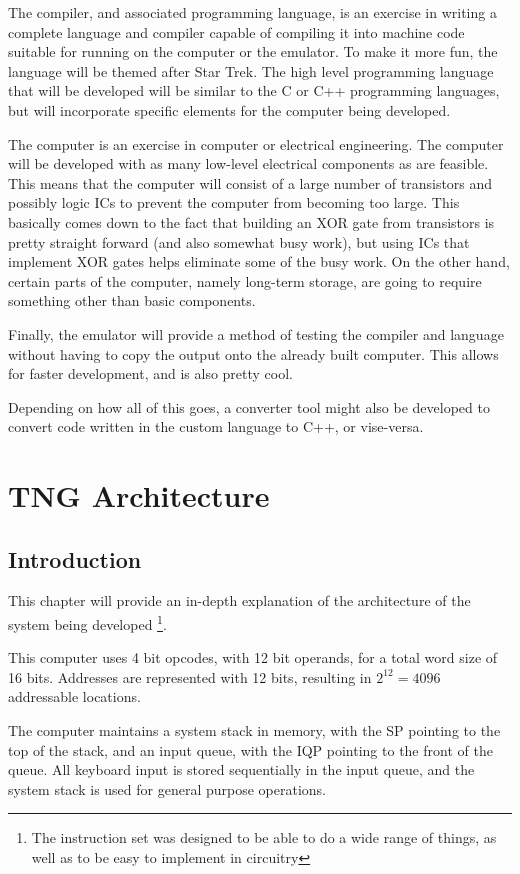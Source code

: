 \documentclass{book}
\begin{document}
The compiler, and associated programming language, is an exercise in writing
a complete language and compiler capable of compiling it into machine code suitable
for running on the computer or the emulator. To make it more fun, the language will
be themed after Star Trek. The high level programming language that will be developed
will be similar to the C or C++ programming languages, but will incorporate specific
elements for the computer being developed.

The computer is an exercise in computer or electrical engineering. The computer will
be developed with as many low-level electrical components as are feasible. This means
that the computer will consist of a large number of transistors and possibly logic ICs
to prevent the computer from becoming too large. This basically comes down to the fact
that building an XOR gate from transistors is pretty straight forward (and also somewhat
busy work), but using ICs that implement XOR gates helps eliminate some of the busy work.
On the other hand, certain parts of the computer, namely long-term storage, are going to
require something other than basic components.

Finally, the emulator will provide a method of testing the compiler and language without having
to copy the output onto the already built computer. This allows for faster development, and
is also pretty cool.

Depending on how all of this goes, a converter tool might also be developed to convert code
written in the custom language to C++, or vise-versa.


\chapter{TNG Architecture}
\section{Introduction}
This chapter will provide an in-depth explanation of the architecture of the
system being developed \footnote{The instruction set was designed to be able to do a
wide range of things, as well as to be easy to implement in circuitry}.

This computer uses 4 bit opcodes, with 12 bit operands, for a total word size of 16 bits.
Addresses are represented with 12 bits, resulting in $2^12 = 4096$ addressable locations.

The computer maintains a system stack in memory, with the SP pointing to the top of the stack,
and an input queue, with the IQP pointing to the front of the queue. All keyboard input is stored
sequentially in the input queue, and the system stack is used for general purpose operations.
\end{document}
